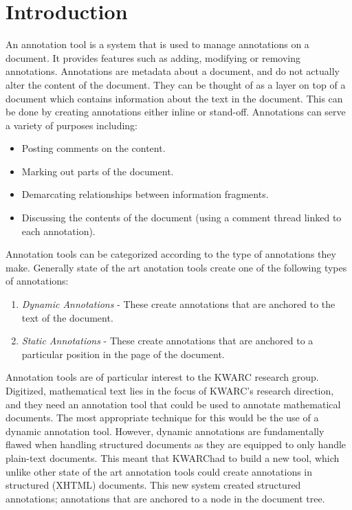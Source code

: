\section{Introduction}

  An annotation tool is a system that is used to manage annotations on a document. It provides features such as adding, modifying or removing annotations. Annotations are metadata about a document, and do not actually alter the content of the document. They can be thought of as a layer on top of a document which contains information about the text in the document. This can be done by creating annotations either inline or stand-off. Annotations can serve a variety of purposes including:
  \begin{itemize}
    \item Posting comments on the content.
    \item Marking out parts of the document.
    \item Demarcating relationships between information fragments.
    \item Discussing the contents of the document (using a comment thread linked to each annotation).
  \end{itemize}

  Annotation tools can be categorized according to the type of annotations they make. Generally state of the art anotation tools create one of the following types of annotations:
  \begin{enumerate}
    \item \textit{Dynamic Annotations} - These create annotations that are anchored to the text of the document.
    \item \textit{Static Annotations} - These create annotations that are anchored to a particular position in the page of the document.
  \end{enumerate}

  Annotation tools are of particular interest to the KWARC research group. Digitized, mathematical text lies in the focus of KWARC's research direction, and they need an annotation tool that could be used to annotate mathematical documents. The most appropriate technique for this would be the use of a dynamic annotation tool. However, dynamic annotations are fundamentally flawed when handling structured documents as they are equipped to only handle plain-text documents. This meant that KWARChad to build a new tool, which unlike other state of the art annotation tools could create annotations in structured (XHTML) documents. This new system created structured annotations; annotations that are anchored to a node in the document tree. 

